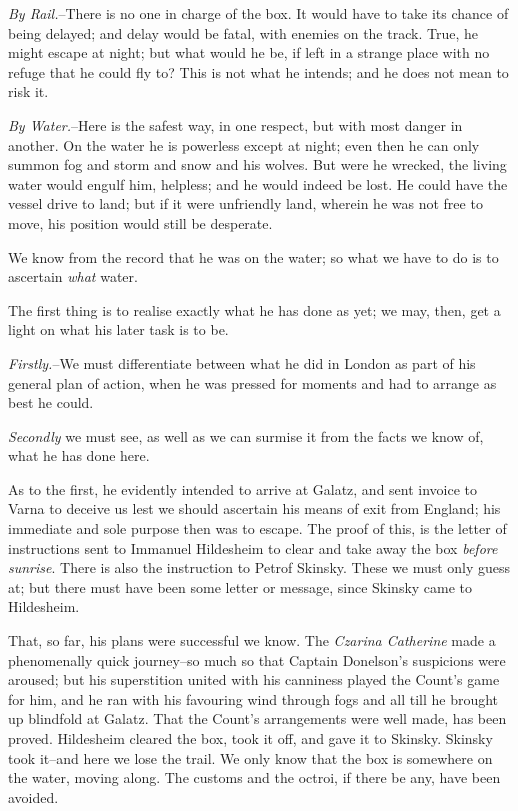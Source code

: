 \documentclass[12pt,openright]{book}
\begin{document}
\textit{By Rail.}–There is no one in charge of the box. It would have to take its chance of being delayed; and delay would be fatal, with enemies on the track. True, he might escape at night; but what would he be, if left in a strange place with no refuge that he could fly to? This is not what he intends; and he does not mean to risk it.

\textit{By Water.}–Here is the safest way, in one respect, but with most danger in another. On the water he is powerless except at night; even then he can only summon fog and storm and snow and his wolves. But were he wrecked, the living water would engulf him, helpless; and he would indeed be lost. He could have the vessel drive to land; but if it were unfriendly land, wherein he was not free to move, his position would still be desperate.

We know from the record that he was on the water; so what we have to do is to ascertain \textit{what} water.

The first thing is to realise exactly what he has done as yet; we may, then, get a light on what his later task is to be.

\textit{Firstly.}–We must differentiate between what he did in London as part of his general plan of action, when he was pressed for moments and had to arrange as best he could.

\textit{Secondly} we must see, as well as we can surmise it from the facts we know of, what he has done here.

As to the first, he evidently intended to arrive at Galatz, and sent invoice to Varna to deceive us lest we should ascertain his means of exit from England; his immediate and sole purpose then was to escape. The proof of this, is the letter of instructions sent to Immanuel Hildesheim to clear and take away the box \textit{before sunrise}. There is also the instruction to Petrof Skinsky. These we must only guess at; but there must have been some letter or message, since Skinsky came to Hildesheim.

That, so far, his plans were successful we know. The \textit{Czarina Catherine} made a phenomenally quick journey–so much so that Captain Donelson’s suspicions were aroused; but his superstition united with his canniness played the Count’s game for him, and he ran with his favouring wind through fogs and all till he brought up blindfold at Galatz. That the Count’s arrangements were well made, has been proved. Hildesheim cleared the box, took it off, and gave it to Skinsky. Skinsky took it–and here we lose the trail. We only know that the box is somewhere on the water, moving along. The customs and the octroi, if there be any, have been avoided.
\end{document}
